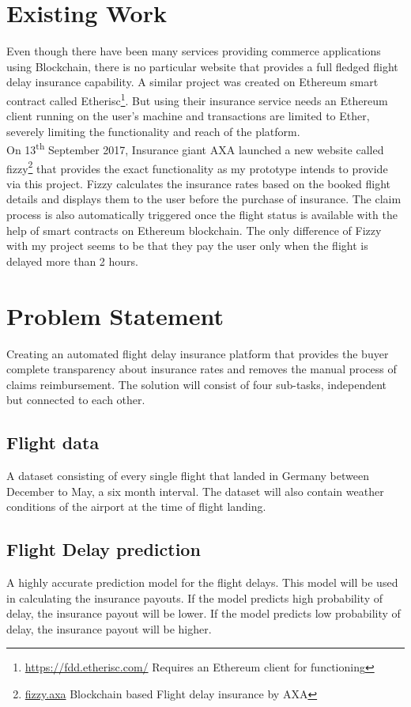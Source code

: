 \section{Existing Work}
Even though there have been many services providing commerce applications using Blockchain, there is no particular website that provides a full fledged flight delay insurance capability. A similar project was created on Ethereum smart contract called Etherisc\footnote{\url{https://fdd.etherisc.com/} Requires an Ethereum client for functioning}. But using their insurance service needs an Ethereum client running on the user's machine and transactions are limited to Ether, severely limiting the functionality and reach of the platform.
\\On 13\textsuperscript{th} September 2017, Insurance giant AXA launched a new website called fizzy\footnote{\url{fizzy.axa} Blockchain based Flight delay insurance by AXA} that provides the exact functionality as my prototype intends to provide via this project. Fizzy calculates the insurance rates based on the booked flight details and displays them to the user before the purchase of insurance. The claim process is also automatically triggered once the flight status is available with the help of smart contracts on Ethereum blockchain. The only difference of Fizzy with my project seems to be that they pay the user only when the flight is delayed more than 2 hours.

\section{Problem Statement}
Creating an automated flight delay insurance platform that provides the buyer complete transparency about insurance rates and removes the manual process of claims reimbursement. The solution will consist of four sub-tasks, independent but connected to each other.
    \subsection{Flight data}
    A dataset consisting of every single flight that landed in Germany between December to May, a six month interval. The dataset will also contain weather conditions of the airport at the time of flight landing.
    \subsection{Flight Delay prediction}
    A highly accurate prediction model for the flight delays. This model will be used in calculating the insurance payouts. If the model predicts high probability of delay, the insurance payout will be lower. If the model predicts low probability of delay, the insurance payout will be higher.

